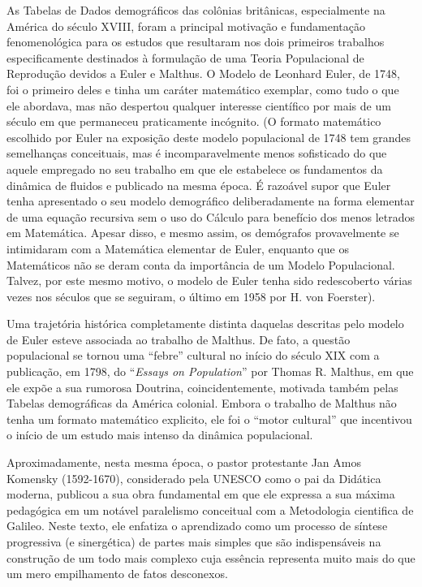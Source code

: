     As Tabelas de Dados demográficos das colônias britânicas, especialmente na América do século XVIII, foram a principal motivação e fundamentação fenomenológica para os estudos que resultaram nos dois primeiros trabalhos especificamente destinados à formulação de uma Teoria Populacional de Reprodução devidos a Euler e Malthus. O Modelo de Leonhard Euler, de 1748, foi o primeiro deles e tinha um caráter matemático exemplar, como tudo o que ele abordava, mas não despertou qualquer interesse científico por mais de um século em que permaneceu praticamente incógnito. (O formato matemático escolhido por Euler na exposição deste modelo populacional de 1748 tem grandes semelhanças conceituais, mas é incomparavelmente menos sofisticado do que aquele empregado no seu trabalho em que ele estabelece os fundamentos da dinâmica de fluidos e publicado na mesma época. É razoável supor que Euler tenha apresentado o seu modelo demográfico deliberadamente na forma elementar de uma equação recursiva sem o uso do Cálculo para benefício dos menos letrados em Matemática. Apesar disso, e mesmo assim, os demógrafos provavelmente se intimidaram com a Matemática elementar de Euler, enquanto que os Matemáticos não se deram conta da importância de um Modelo Populacional. Talvez, por este mesmo motivo, o modelo de Euler tenha sido redescoberto várias vezes nos séculos que se seguiram, o último em 1958 por H. von Foerster).

    Uma trajetória histórica completamente distinta daquelas descritas pelo modelo de Euler esteve associada ao trabalho de Malthus. De fato, a questão populacional se tornou uma ``febre'' cultural no início do século XIX com a publicação, em 1798, do ``\textit{Essays on Population}'' por Thomas R. Malthus, em que ele expõe a sua rumorosa Doutrina, coincidentemente, motivada também pelas Tabelas demográficas da América colonial. Embora o trabalho de Malthus não tenha um formato matemático explicito, ele foi o ``motor cultural'' que incentivou o início de um estudo mais intenso da dinâmica populacional.

    Aproximadamente, nesta mesma época, o pastor protestante Jan Amos Komensky (1592-1670), considerado pela UNESCO como o pai da Didática moderna, publicou a sua obra fundamental em que ele expressa a sua máxima pedagógica em um notável paralelismo conceitual com a Metodologia cientifica de Galileo. Neste texto, ele enfatiza o aprendizado como um processo de síntese progressiva (e sinergética) de partes mais simples que são indispensáveis na construção de um todo mais complexo cuja essência representa muito mais do que um mero empilhamento de fatos desconexos.

